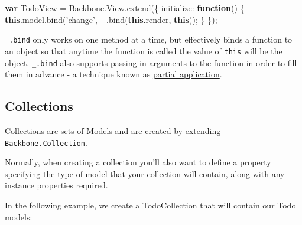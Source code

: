 \documentclass[9pt]{book}
\newenvironment{Shaded}{}{}
\newcommand{\KeywordTok}[1]{\textcolor[rgb]{0.00,0.44,0.13}{\textbf{{#1}}}}
\newcommand{\DataTypeTok}[1]{\textcolor[rgb]{0.56,0.13,0.00}{{#1}}}
\newcommand{\StringTok}[1]{\textcolor[rgb]{0.25,0.44,0.63}{{#1}}}
\newcommand{\OtherTok}[1]{\textcolor[rgb]{0.00,0.44,0.13}{{#1}}}
\newcommand{\FunctionTok}[1]{\textcolor[rgb]{0.02,0.16,0.49}{{#1}}}
\newcommand{\NormalTok}[1]{{#1}}
\begin{document}
\begin{Shaded}
\begin{Highlighting}[]

\KeywordTok{var} \NormalTok{TodoView = }\OtherTok{Backbone}\NormalTok{.}\OtherTok{View}\NormalTok{.}\FunctionTok{extend}\NormalTok{(\{}
  \DataTypeTok{initialize}\NormalTok{: }\KeywordTok{function}\NormalTok{() \{}
    \KeywordTok{this}\NormalTok{.}\OtherTok{model}\NormalTok{.}\FunctionTok{bind}\NormalTok{(}\StringTok{'change'}\NormalTok{, }\OtherTok{_}\NormalTok{.}\FunctionTok{bind}\NormalTok{(}\KeywordTok{this}\NormalTok{.}\FunctionTok{render}\NormalTok{, }\KeywordTok{this}\NormalTok{));}
  \NormalTok{\}}
\NormalTok{\});}
\end{Highlighting}
\end{Shaded}

\texttt{\_.bind} only works on one method at a time, but effectively
binds a function to an object so that anytime the function is called the
value of \texttt{this} will be the object. \texttt{\_.bind} also
supports passing in arguments to the function in order to fill them in
advance - a technique known as
\href{http://benalman.com/news/2012/09/partial-application-in-javascript/}{partial
application}.

\subsection{Collections}\label{collections}

Collections are sets of Models and are created by extending
\texttt{Backbone.Collection}.

Normally, when creating a collection you'll also want to define a
property specifying the type of model that your collection will contain,
along with any instance properties required.

In the following example, we create a TodoCollection that will contain
our Todo models:
\end{document}
